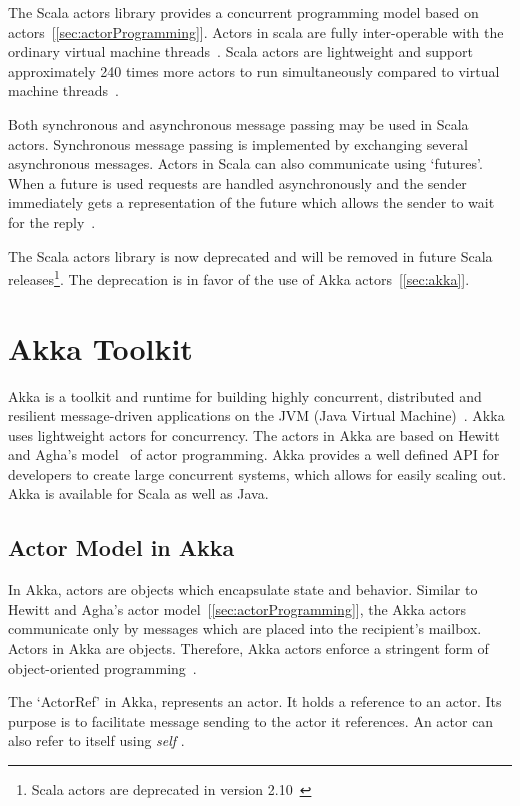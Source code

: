   The Scala actors library provides a concurrent programming model based on actors~[\autoref{sec:actorProgramming}]. Actors in scala are fully inter-operable with the ordinary virtual machine threads~\cite{Haller}. Scala actors are lightweight and support approximately 240 times more actors to run simultaneously compared to virtual machine threads~\cite{Haller}.

  Both synchronous and asynchronous message passing may be used in Scala actors. Synchronous message passing is implemented by exchanging several asynchronous messages. Actors in Scala can also communicate using ‘futures’. When a future is used requests are handled asynchronously and the sender immediately gets a representation of the future which allows the sender to wait for the reply~\cite{scalaActors}.

  The Scala actors library is now deprecated and will be removed in future Scala releases\footnote{Scala actors are deprecated in version 2.10~\cite{scalaActorsAPI}}. The deprecation is in favor of the use of Akka actors~[\autoref{sec:akka}].

\section{Akka Toolkit}
\label{sec:akka}
Akka is a toolkit and runtime for building highly concurrent, distributed and resilient message-driven applications on the JVM (Java Virtual Machine)~\cite{akkaHome}. Akka uses lightweight actors for concurrency. The actors in Akka are based on Hewitt and Agha's model~\cite{agha, hewitt} of actor programming. Akka provides a well defined API for developers to create large concurrent systems, which allows for easily scaling out.
  Akka is available for Scala as well as Java.

  \subsection{Actor Model in Akka}
  In Akka, actors are objects which encapsulate state and behavior. Similar to Hewitt and Agha's actor model~[\autoref{sec:actorProgramming}], the Akka actors communicate only by messages which are placed into the recipient’s mailbox. Actors in Akka are objects. Therefore, Akka actors enforce a stringent form of object-oriented programming~\cite{akkaActorSystem}.

  The ‘ActorRef’ in Akka, represents an actor. It holds a reference to an actor. Its purpose is to facilitate message sending to the actor it references. An actor can also refer to itself using \emph{self} \cite{akkaJavaDoc}.

